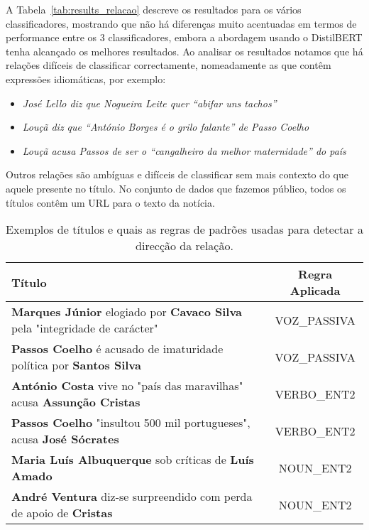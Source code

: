 \documentclass[a4paper, twocolumn, 11pt, twoside]{article}
\begin{document}
A Tabela~\ref{tab:results_relacao} descreve os resultados para os vários classificadores, mostrando que não há diferenças muito acentuadas em termos de performance entre os 3 classificadores, embora a abordagem usando o DistilBERT tenha alcançado os melhores resultados. Ao analisar os resultados notamos que há relações difíceis de classificar correctamente, nomeadamente as que contêm expressões idiomáticas, por exemplo:

\begin{itemize}
\item{\textit{José Lello diz que Nogueira Leite quer “abifar uns tachos”}}
\item{\textit{Louçã diz que “António Borges é o grilo falante” de Passo Coelho}}
\item{\textit{Louçã acusa Passos de ser o “cangalheiro da melhor maternidade” do país}}
\end{itemize}

Outros relações são ambíguas e difíceis de classificar sem mais contexto do que aquele presente no título. No conjunto de dados que fazemos público, todos os títulos contêm um URL para o texto da notícia.

\begin{table*}
  \centering
  \begin{tabular}{lc}
      {\bf Título} & {\bf Regra Aplicada} \\
      \hline
	  \textbf{Marques Júnior} elogiado por \textbf{Cavaco Silva} pela "integridade de carácter" & VOZ\_PASSIVA \\
	  \textbf{Passos Coelho} é acusado de imaturidade política por \textbf{Santos Silva}  		& VOZ\_PASSIVA \\
	  \textbf{António Costa} vive no "país das maravilhas" acusa \textbf{Assunção Cristas}      & VERBO\_ENT2 \\
	  \textbf{Passos Coelho} "insultou 500 mil portugueses", acusa \textbf{José Sócrates}		& VERBO\_ENT2 \\ 
	  \textbf{Maria Luís Albuquerque} sob críticas de \textbf{Luís Amado}						& NOUN\_ENT2 \\
	  \textbf{André Ventura} diz-se surpreendido com perda de apoio de \textbf{Cristas}			& NOUN\_ENT2 \\

	  \hline
  \end{tabular}
  \caption{Exemplos de títulos e quais as regras de padrões usadas para detectar a direcção da relação.}
  \label{tab:examples_patterns_direction}
\end{table*}
\end{document}
